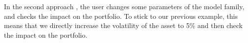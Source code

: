 \documentclass[letter, 12pt]{article}
\newcommand{\transpose}{^\mathsf{T}}
\newcommand{\suchthat}{\text{s.t.}}
\newcommand{\inv}{^{-1}}
\begin{document}
In the second approach \cite{danielsson2016, so2013, rebonato2000}, the user changes some parameters of the model family, and checks the impact on the portfolio. To stick to our previous example, this means that we directly increase the volatility of the asset to 5\% and then check the impact on the portfolio.
%


\end{document}
